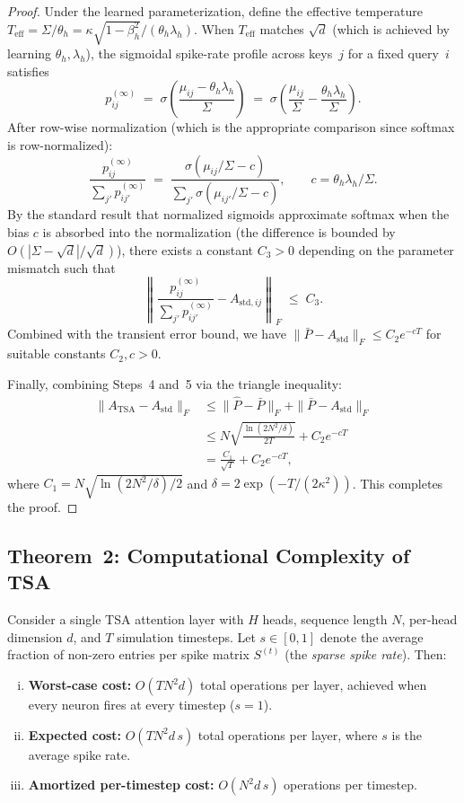\documentclass{article}
\begin{document}
\begin{proof}
Under the learned parameterization, define the effective temperature
$T_{\mathrm{eff}} = \Sigma / \theta_h = \kappa\sqrt{1-\beta_h^2} / (\theta_h \lambda_h)$.
When $T_{\mathrm{eff}}$ matches $\sqrt{d}$ (which is achieved by learning
$\theta_h, \lambda_h$), the sigmoidal spike-rate profile across keys~$j$
for a fixed query~$i$ satisfies
\[
  p_{ij}^{(\infty)} \;=\; \sigma\!\left(\frac{\mu_{ij} - \theta_h\lambda_h}
    {\Sigma}\right)
  \;=\; \sigma\!\left(\frac{\mu_{ij}}{\Sigma} - \frac{\theta_h\lambda_h}{\Sigma}\right).
\]
After row-wise normalization (which is the appropriate comparison since
softmax is row-normalized):
\[
  \frac{p_{ij}^{(\infty)}}{\sum_{j'} p_{ij'}^{(\infty)}}
  \;=\; \frac{\sigma(\mu_{ij}/\Sigma - c)}{\sum_{j'}\sigma(\mu_{ij'}/\Sigma - c)},
  \qquad c = \theta_h\lambda_h/\Sigma.
\]
By the standard result that normalized sigmoids approximate softmax when
the bias $c$ is absorbed into the normalization (the difference is bounded
by $O(|\Sigma - \sqrt{d}|/\sqrt{d})$), there exists a constant $C_3 > 0$
depending on the parameter mismatch such that
\[
  \left\|\frac{p_{ij}^{(\infty)}}{\sum_{j'} p_{ij'}^{(\infty)}}
    - A_{\mathrm{std},ij}\right\|_F \;\le\; C_3.
\]
Combined with the transient error bound, we have
$\|\bar{P} - A_{\mathrm{std}}\|_F \le C_2 e^{-cT}$ for suitable
constants $C_2, c > 0$.

Finally, combining Steps~4 and~5 via the triangle inequality:
\begin{align*}
  \|A_{\mathrm{TSA}} - A_{\mathrm{std}}\|_F
  &\le \|\hat{P} - \bar{P}\|_F + \|\bar{P} - A_{\mathrm{std}}\|_F\\
  &\le N\sqrt{\frac{\ln(2N^2/\delta)}{2T}} + C_2 e^{-cT}\\
  &= \frac{C_1}{\sqrt{T}} + C_2 e^{-cT},
\end{align*}
where $C_1 = N\sqrt{\ln(2N^2/\delta)/2}$ and
$\delta = 2\exp(-T/(2\kappa^2))$.
This completes the proof.
\end{proof}


\subsection{Theorem~2: Computational Complexity of TSA}\label{sec:thm2}

\begin{theorem}
\label{thm:complexity}
Consider a single TSA attention layer with $H$ heads, sequence length $N$,
per-head dimension $d$, and $T$ simulation timesteps.
Let $s \in [0,1]$ denote the average fraction of non-zero entries per
spike matrix $S^{(t)}$ (the \emph{sparse spike rate}).
Then:
\begin{enumerate}[(i)]
  \item \textbf{Worst-case cost:}
    $O(T N^2 d)$ total operations per layer, achieved when every
    neuron fires at every timestep ($s = 1$).
  \item \textbf{Expected cost:}
    $O(T N^2 d \, s)$ total operations per layer, where $s$ is the
    average spike rate.
  \item \textbf{Amortized per-timestep cost:}
    $O(N^2 d \, s)$ operations per timestep.
\end{enumerate}
\end{theorem}
\end{document}
